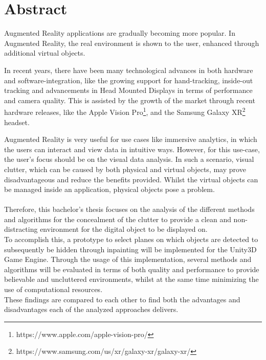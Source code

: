 \chapter{Abstract}

Augmented Reality applications are gradually becoming more popular. In Augmented Reality, the real environment is shown to the user, enhanced through additional virtual objects.

In recent years, there have been many technological advances in both hardware and software-integration, like the growing support for hand-tracking, 
inside-out tracking and advancements in Head Mounted Displays in terms of performance and camera quality. This is assisted by the growth of the market through recent hardware releases, 
like the Apple Vision Pro\footnote{https://www.apple.com/apple-vision-pro/}, and the Samsung Galaxy XR\footnote{https://www.samsung.com/us/xr/galaxy-xr/galaxy-xr/} headset.

Augmented Reality is very useful for use cases like immersive analytics, in which the users can interact and view data in intuitive ways. However, for this use-case, the user's focus should be on the visual data analysis. In such a scenario, visual clutter, which can be caused by both physical and virtual objects, may prove disadvantageous and reduce the benefits provided. 
Whilst the virtual objects can be managed inside an application, physical objects pose a problem.
\\\\
Therefore, this bachelor's thesis focuses on the analysis of the different methods and algorithms for the concealment of the clutter to provide a clean and non-distracting environment for the digital object to be displayed on. 
\\
To accomplish this, a prototype to select planes on which objects are detected to subsequently be hidden through inpainting will be implemented for the Unity3D Game Engine. Through the usage of this implementation, several methods and algorithms will be evaluated in terms of both quality and performance to provide believable and uncluttered environments, whilst at the same time minimizing the use of computational resources.
\\ 
These findings are compared to each other to find both the advantages and disadvantages each of the analyzed approaches delivers.